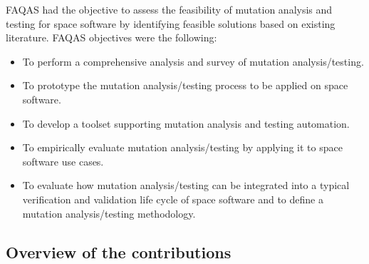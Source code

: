 FAQAS had the objective to assess the feasibility of mutation analysis and testing for space software by identifying feasible solutions based on existing literature. FAQAS objectives were the following:
\begin{itemize}
\item To perform a comprehensive analysis and survey of mutation analysis/testing.
\item To prototype the mutation analysis/testing process to be applied on space software. 
\item To develop a toolset supporting mutation analysis and testing automation.
\item To empirically evaluate mutation analysis/testing by applying it to space software use cases. 
\item To evaluate how mutation analysis/testing can be integrated into a typical verification and validation life cycle of space software and to define a mutation analysis/testing methodology. 
\end{itemize}


\subsection*{Overview of the contributions}

